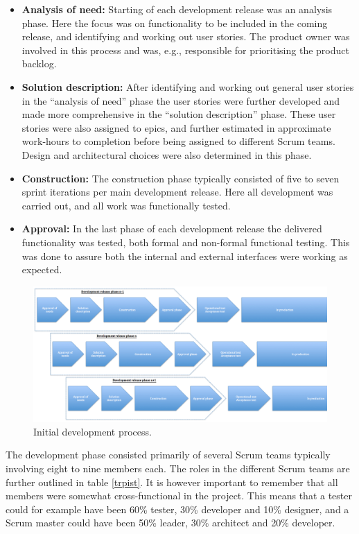 \begin{itemize}
   \item \textbf{Analysis of need:} Starting of each development release was an analysis phase. Here the focus was on functionality to be included in the coming release, and identifying and working out user stories. The product owner was involved in this process and was, e.g., responsible for prioritising the product backlog.
   \item \textbf{Solution description:} After identifying and working out general user stories in the ``analysis of need'' phase the user stories were further developed and made more comprehensive in the ``solution description'' phase. These user stories were also assigned to epics, and further estimated in approximate work-hours to completion before being assigned to different Scrum teams. Design and architectural choices were also determined in this phase.
   \item \textbf{Construction:} The construction phase typically consisted of five to seven sprint iterations per main development release. Here all development was carried out, and all work was functionally tested.
   \item \textbf{Approval:} In the last phase of each development release the delivered functionality was tested, both formal and non-formal functional testing. This was done to assure both the internal and external interfaces were working as expected.
\end{itemize}

\begin{figure}[H]
\centering
\includegraphics[trim = 0mm 0mm 0mm 0mm,width=155mm]{images/initial_development_process}
\caption{Initial development process.}
\label{initial_development_process}
\end{figure}

The development phase consisted primarily of several Scrum teams typically involving eight to nine members each. The roles in the different Scrum teams are further outlined in table \ref{trpist}. It is however important to remember that all members were somewhat cross-functional in the project. This means that a tester could for example have been 60\% tester, 30\% developer and 10\% designer, and a Scrum master could have been 50\% leader, 30\% architect and 20\% developer. 

